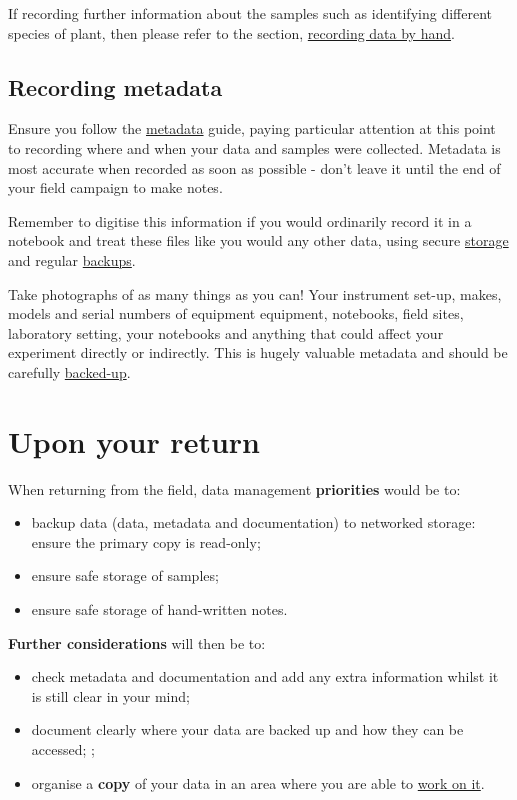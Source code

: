 \documentclass[a4paper,oneside]{report}
\providecommand{\tightlist}{%
  \setlength{\itemsep}{0pt}\setlength{\parskip}{0pt}}
\begin{document}
If recording further information about the samples such as identifying
different species of plant, then please refer to the section,
\protect\hyperlink{recording-data-by-hand}{recording data by hand}.

\hypertarget{recording-metadata}{%
\section{Recording metadata}\label{recording-metadata}}

Ensure you follow the \protect\hyperlink{metadata}{metadata} guide,
paying particular attention at this point to recording where and when
your data and samples were collected. Metadata is most accurate when
recorded as soon as possible - don't leave it until the end of your
field campaign to make notes.

Remember to digitise this information if you would ordinarily record it
in a notebook and treat these files like you would any other data, using
secure \protect\hyperlink{storing-data}{storage} and regular
\protect\hyperlink{backing-up-data}{backups}.

Take photographs of as many things as you can! Your instrument set-up,
makes, models and serial numbers of equipment equipment, notebooks,
field sites, laboratory setting, your notebooks and anything that could
affect your experiment directly or indirectly. This is hugely valuable
metadata and should be carefully
\protect\hyperlink{backing-up-data}{backed-up}.

\hypertarget{upon-your-return}{%
\chapter{Upon your return}\label{upon-your-return}}

When returning from the field, data management \textbf{priorities} would
be to:

\begin{itemize}
\tightlist
\item
  backup data (data, metadata and documentation) to networked storage:
  ensure the primary copy is read-only;
\item
  ensure safe storage of samples;
\item
  ensure safe storage of hand-written notes.
\end{itemize}

\textbf{Further considerations} will then be to:

\begin{itemize}
\tightlist
\item
  check metadata and documentation and add any extra information whilst
  it is still clear in your mind;
\item
  document clearly where your data are backed up and how they can be
  accessed; ;
\item
  organise a \textbf{copy} of your data in an area where you are able to
  \protect\hyperlink{working-on-your-data}{work on it}.
\end{itemize}
\end{document}
